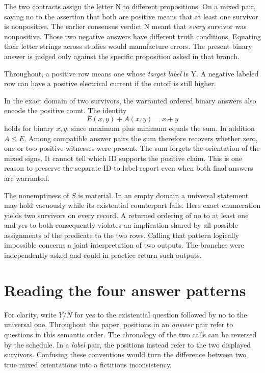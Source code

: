 \documentclass[12pt,letterpaper]{article}
\begin{document}
The two contracts assign the letter N to different propositions. On a mixed pair, saying no to the assertion that both are positive means that at least one survivor is nonpositive. The earlier consensus verdict N meant that \emph{every} survivor was nonpositive. Those two negative answers have different truth conditions. Equating their letter strings across studies would manufacture errors. The present binary answer is judged only against the specific proposition asked in that branch.

Throughout, a positive row means one whose \emph{target label} is Y. A negative labeled row can have a positive electrical current if the cutoff is still higher.

In the exact domain of two survivors, the warranted ordered binary answers also encode the positive count. The identity
\[
 E(x,y)+A(x,y)=x+y
\]
holds for binary $x,y$, since maximum plus minimum equals the sum. In addition $A\leq E$. Among compatible answer pairs the sum therefore recovers whether zero, one or two positive witnesses were present. The sum forgets the orientation of the mixed signs. It cannot tell which ID supports the positive claim. This is one reason to preserve the separate ID-to-label report even when both final answers are warranted.

The nonemptiness of $S$ is material. In an empty domain a universal statement may hold vacuously while its existential counterpart fails. Here exact enumeration yields two survivors on every record. A returned ordering of no to at least one and yes to both consequently violates an implication shared by all possible assignments of the predicate to the two rows. Calling that pattern logically impossible concerns a joint interpretation of two outputs. The branches were independently asked and could in practice return such outputs.

\section{Reading the four answer patterns}
For clarity, write $Y/N$ for yes to the existential question followed by no to the universal one. Throughout the paper, positions in an \emph{answer} pair refer to questions in this semantic order. The chronology of the two calls can be reversed by the schedule. In a \emph{label} pair, the positions instead refer to the two displayed survivors. Confusing these conventions would turn the difference between two true mixed orientations into a fictitious inconsistency.
\end{document}
